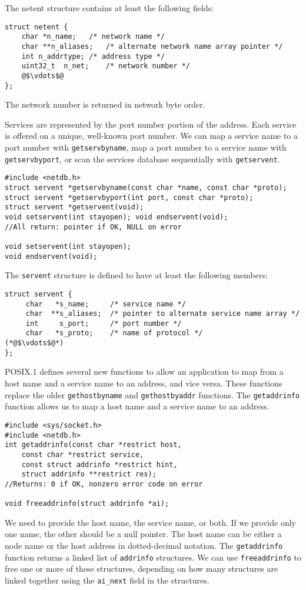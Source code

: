 \documentclass[12pt, letterpaper]{article}
\theoremstyle{definition}
\let\cd\lstinline
\begin{document}
The netent structure contains at least the following fields: 
\begin{lstlisting}
struct netent {
	char *n_name;	/* network name */
	char **n_aliases;	/* alternate network name array pointer */
	int n_addrtype;	/* address type */
	uint32_t  n_net;	/* network number */
	@$\vdots$@
};
\end{lstlisting}
The network number is returned in network byte order.

Services are represented by the port number portion of the address. Each service is offered on a unique, well-known port number. We can map a service name to a port number with \cd+getservbyname+, map a port number to a service name with \cd+getservbyport+, or scan the services database sequentially with \cd+getservent+.
\begin{lstlisting}
#include <netdb.h>
struct servent *getservbyname(const char *name, const char *proto);
struct servent *getservbyport(int port, const char *proto);
struct servent *getservent(void);
void setservent(int stayopen); void endservent(void);
//All return: pointer if OK, NULL on error

void setservent(int stayopen);
void endservent(void);
\end{lstlisting}
The \cd+servent+ structure is defined to have at least the following members:
\begin{lstlisting}
struct servent {
     char   *s_name;     /* service name */
     char  **s_aliases;  /* pointer to alternate service name array */
     int     s_port;     /* port number */
     char   *s_proto;    /* name of protocol */
(*@$\vdots$@*)
};
\end{lstlisting}

POSIX.1 defines several new functions to allow an application to map from a host name and a service name to an address, and vice versa. These functions replace the older \cd+gethostbyname+ and \cd+gethostbyaddr+ functions.
The \cd+getaddrinfo+ function allows us to map a host name and a service name to an address.
\begin{lstlisting}
#include <sys/socket.h>
#include <netdb.h>
int getaddrinfo(const char *restrict host,
	const char *restrict service,
	const struct addrinfo *restrict hint, 
	struct addrinfo **restrict res);
//Returns: 0 if OK, nonzero error code on error

void freeaddrinfo(struct addrinfo *ai);
\end{lstlisting}
We need to provide the host name, the service name, or both. If we provide only one name, the other should be a null pointer. The host name can be either a node name or the host address in dotted-decimal notation.
The \cd+getaddrinfo+ function returns a linked list of \cd+addrinfo+ structures. We can use \cd+freeaddrinfo+ to free one or more of these structures, depending on how many structures are linked together using the \cd+ai_next+ field in the structures.
\end{document}
